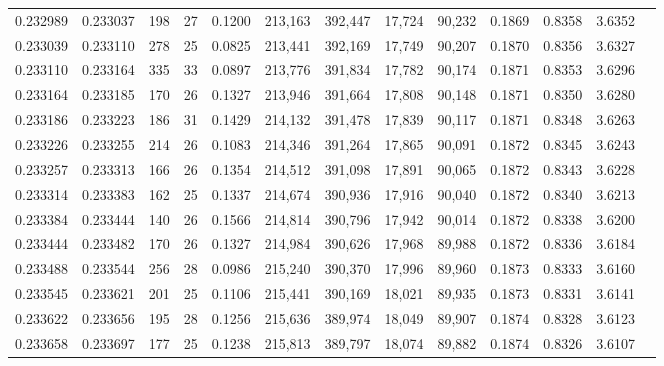 \begin{tabular}{rrrrrrrrrrrrr}
0.232989 & 0.233037 &   198 &  27 &                                     0.1200 & 213,163 & 392,447 &  17,724 &  90,232 & 0.1869 & 0.8358 & 3.6352 \\
0.233039 & 0.233110 &   278 &  25 &                                     0.0825 & 213,441 & 392,169 &  17,749 &  90,207 & 0.1870 & 0.8356 & 3.6327 \\
0.233110 & 0.233164 &   335 &  33 &                                     0.0897 & 213,776 & 391,834 &  17,782 &  90,174 & 0.1871 & 0.8353 & 3.6296 \\
0.233164 & 0.233185 &   170 &  26 &                                     0.1327 & 213,946 & 391,664 &  17,808 &  90,148 & 0.1871 & 0.8350 & 3.6280 \\
0.233186 & 0.233223 &   186 &  31 &                                     0.1429 & 214,132 & 391,478 &  17,839 &  90,117 & 0.1871 & 0.8348 & 3.6263 \\
0.233226 & 0.233255 &   214 &  26 &                                     0.1083 & 214,346 & 391,264 &  17,865 &  90,091 & 0.1872 & 0.8345 & 3.6243 \\
0.233257 & 0.233313 &   166 &  26 &                                     0.1354 & 214,512 & 391,098 &  17,891 &  90,065 & 0.1872 & 0.8343 & 3.6228 \\
0.233314 & 0.233383 &   162 &  25 &                                     0.1337 & 214,674 & 390,936 &  17,916 &  90,040 & 0.1872 & 0.8340 & 3.6213 \\
0.233384 & 0.233444 &   140 &  26 &                                     0.1566 & 214,814 & 390,796 &  17,942 &  90,014 & 0.1872 & 0.8338 & 3.6200 \\
0.233444 & 0.233482 &   170 &  26 &                                     0.1327 & 214,984 & 390,626 &  17,968 &  89,988 & 0.1872 & 0.8336 & 3.6184 \\
0.233488 & 0.233544 &   256 &  28 &                                     0.0986 & 215,240 & 390,370 &  17,996 &  89,960 & 0.1873 & 0.8333 & 3.6160 \\
0.233545 & 0.233621 &   201 &  25 &                                     0.1106 & 215,441 & 390,169 &  18,021 &  89,935 & 0.1873 & 0.8331 & 3.6141 \\
0.233622 & 0.233656 &   195 &  28 &                                     0.1256 & 215,636 & 389,974 &  18,049 &  89,907 & 0.1874 & 0.8328 & 3.6123 \\
0.233658 & 0.233697 &   177 &  25 &                                     0.1238 & 215,813 & 389,797 &  18,074 &  89,882 & 0.1874 & 0.8326 & 3.6107 \\

\end{tabular}
